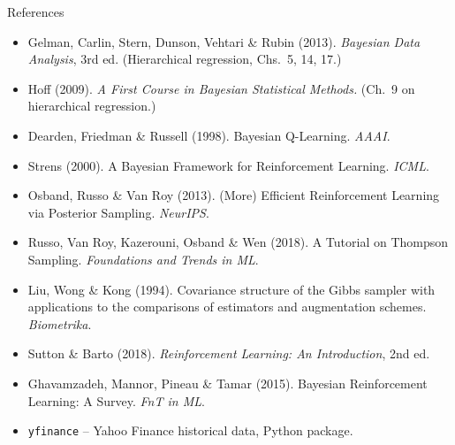 \documentclass[10pt,aspectratio=169]{beamer}
\begin{document}
\begin{frame}{References}
\footnotesize
\begin{itemize}
  \item Gelman, Carlin, Stern, Dunson, Vehtari \& Rubin (2013).
        \emph{Bayesian Data Analysis}, 3rd ed.
        (Hierarchical regression, Chs.~5, 14, 17.)
  \item Hoff (2009). \emph{A First Course in Bayesian Statistical
        Methods.} (Ch.~9 on hierarchical regression.)
  \item Dearden, Friedman \& Russell (1998). Bayesian Q-Learning.
        \emph{AAAI}.
  \item Strens (2000). A Bayesian Framework for Reinforcement
        Learning. \emph{ICML}.
  \item Osband, Russo \& Van Roy (2013). (More) Efficient
        Reinforcement Learning via Posterior Sampling. \emph{NeurIPS}.
  \item Russo, Van Roy, Kazerouni, Osband \& Wen (2018). A Tutorial on
        Thompson Sampling. \emph{Foundations and Trends in ML}.
  \item Liu, Wong \& Kong (1994). Covariance structure of the Gibbs
        sampler with applications to the comparisons of estimators and
        augmentation schemes. \emph{Biometrika}.
  \item Sutton \& Barto (2018). \emph{Reinforcement Learning: An
        Introduction}, 2nd ed.
  \item Ghavamzadeh, Mannor, Pineau \& Tamar (2015). Bayesian
        Reinforcement Learning: A Survey. \emph{FnT in ML}.
  \item \texttt{yfinance} -- Yahoo Finance historical data, Python
        package.
\end{itemize}
\end{frame}
\end{document}
